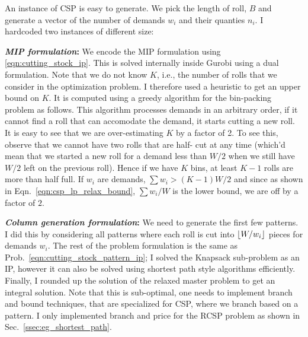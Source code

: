 \documentclass[letterpaper, 10pt, twocolumn, reqno]{amsart}
\begin{document}
An instance of CSP is easy to generate. We pick the length of roll, $B$ and generate a vector of the number of demands $w_i$ and their quanties $n_i$. I hardcoded two instances of different size:

\textbf{\emph{MIP formulation}:} We encode the MIP formulation using \eqref{eqn:cutting_stock_ip}. This is solved internally inside Gurobi using a dual formulation. Note that we do not know $K$, i.e., the number of rolls that we
consider in the optimization problem. I therefore used a heuristic to get an upper bound on $K$. It is computed using a greedy algorithm for the bin-packing problem as follows. This algorithm processes demands in an arbitrary
order, if it cannot find a roll that can accomodate the demand, it starts
cutting a new roll. It is easy to see that we are over-estimating $K$ by a factor of 2. To see this, observe that we cannot have two rolls that are half-
cut at any time (which'd mean that we started a new roll for a demand less than $W/2$ when we still have $W/2$ left on the previous roll). Hence if we
have $K$ bins, at least $K-1$ rolls are more than half full. If $w_i$ are demands, $\sum w_i > (K-1) W/2$ and since as shown in Eqn.~\eqref{eqn:csp_lp_relax_bound}, $\sum w_i/W$ is the lower bound, we are off by a factor of $2$.

\textbf{\emph{Column generation formulation}:} We need to generate the first few patterns. I did this by considering all patterns where each roll is cut into $\lfloor W/w_i\rfloor$ pieces for demands $w_i$. The rest of the problem formulation is the same as Prob.~\ref{eqn:cutting_stock_pattern_ip}; I solved the Knapsack sub-problem as an IP, however it can also be solved using shortest path style algorithms efficiently. Finally, I rounded up the solution of the relaxed master problem to get an integral solution. Note that this is sub-optimal, one needs to implement branch and bound techniques, that are specialized for CSP, where we branch based on a pattern. I only implemented branch and price for the RCSP problem as shown in Sec.~\ref{ssec:eg_shortest_path}.
\end{document}
